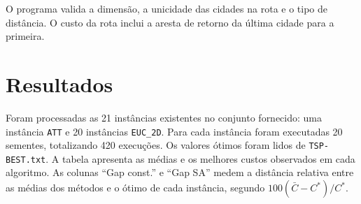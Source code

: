 \documentclass[12pt,a4paper]{article}
\begin{document}
O programa valida a dimensão, a unicidade das cidades na rota e o tipo de distância. O custo da rota inclui a aresta de retorno da última cidade para a primeira.

\section{Resultados}
Foram processadas as 21 instâncias existentes no conjunto fornecido: uma instância \texttt{ATT} e 20 instâncias \texttt{EUC\_2D}. Para cada instância foram executadas 20 sementes, totalizando 420 execuções. Os valores ótimos foram lidos de \texttt{TSP-BEST.txt}. A tabela apresenta as médias e os melhores custos observados em cada algoritmo. As colunas ``Gap const.'' e ``Gap SA'' medem a distância relativa entre as médias dos métodos e o ótimo de cada instância, segundo $100(\bar{C}-C^*)/C^*$.
\end{document}
